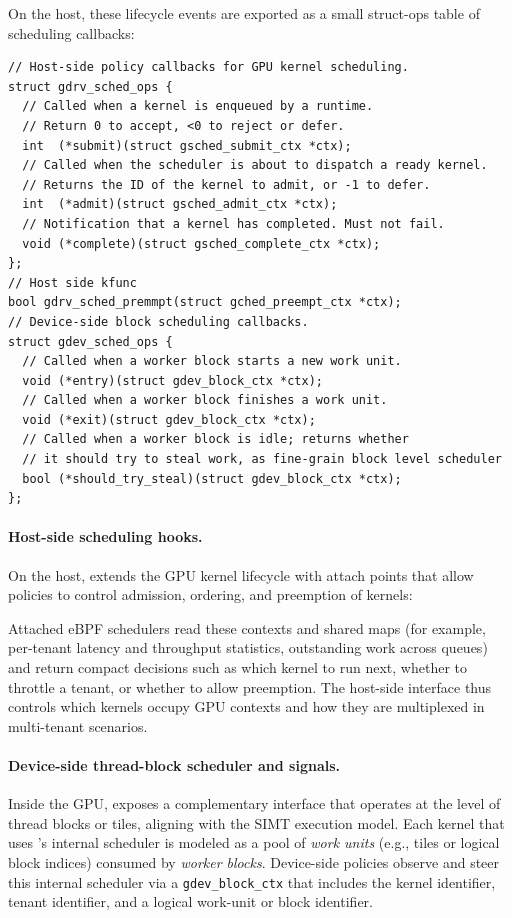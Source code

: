 On the host, these lifecycle events are exported as a small struct-ops table of
scheduling callbacks:

\begin{verbatim}
// Host-side policy callbacks for GPU kernel scheduling.
struct gdrv_sched_ops {
  // Called when a kernel is enqueued by a runtime.
  // Return 0 to accept, <0 to reject or defer.
  int  (*submit)(struct gsched_submit_ctx *ctx);
  // Called when the scheduler is about to dispatch a ready kernel.
  // Returns the ID of the kernel to admit, or -1 to defer.
  int  (*admit)(struct gsched_admit_ctx *ctx);
  // Notification that a kernel has completed. Must not fail.
  void (*complete)(struct gsched_complete_ctx *ctx);
};
// Host side kfunc
bool gdrv_sched_premmpt(struct gched_preempt_ctx *ctx);
// Device-side block scheduling callbacks.
struct gdev_sched_ops {
  // Called when a worker block starts a new work unit.
  void (*entry)(struct gdev_block_ctx *ctx);
  // Called when a worker block finishes a work unit.
  void (*exit)(struct gdev_block_ctx *ctx);
  // Called when a worker block is idle; returns whether
  // it should try to steal work, as fine-grain block level scheduler
  bool (*should_try_steal)(struct gdev_block_ctx *ctx);
};
\end{verbatim}

\paragraph{Host-side scheduling hooks.}
On the host, \sys extends the GPU kernel lifecycle with attach points that allow
policies to control admission, ordering, and preemption of kernels:

Attached eBPF schedulers read these contexts and shared maps (for example, per-tenant
latency and throughput statistics, outstanding work across queues) and return compact
decisions such as which kernel to run next, whether to throttle a tenant, or whether
to allow preemption. The host-side interface thus controls which kernels occupy GPU
contexts and how they are multiplexed in multi-tenant scenarios.
\paragraph{Device-side thread-block scheduler and signals.}

Inside the GPU, \sys exposes a complementary interface that operates at the level of
thread blocks or tiles, aligning with the SIMT execution model. Each kernel that uses \sys's internal scheduler is modeled as a pool of \emph{work units} (e.g., tiles or logical block indices) consumed by \emph{worker blocks}. Device-side policies observe and steer this internal scheduler via a \texttt{gdev\_block\_ctx} that includes the kernel identifier, tenant identifier, and a logical work-unit or block identifier.

